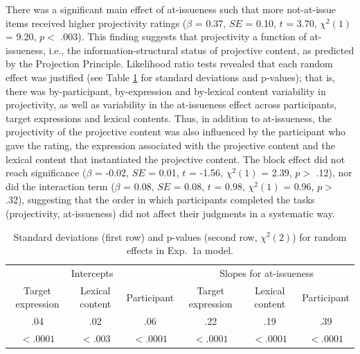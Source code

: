 \documentclass[11pt,fleqn]{article}
\newcommand{\6}{\mbox{$[\hspace*{-.6mm}[$}}
\newcommand{\9}{\mbox{$]\hspace*{-.6mm}]$}}
\newcommand{\tableref}[1]{Table \ref{#1}}
\begin{document}
There was a significant main effect of at-issueness such that more not-at-issue items received higher projectivity ratings ($\beta$ = 0.37, $SE$ = 0.10, $t$ = 3.70, $\chi^2(1)$ = 9.20, $p <$ .003). This finding suggests that projectivity a function of at-issueness, i.e., the information-structural status of projective content, as predicted by the Projection Principle. Likelihood ratio tests revealed that each random effect was justified (see \tableref{tab:random1a} for standard deviations and p-values); that is, there was by-participant, by-expression and by-lexical content variability in projectivity, as well as variability in the at-issueness effect across participants, target expressions and lexical contents. Thus, in addition to at-issueness, the projectivity of the projective content was also influenced by the participant who gave the rating, the expression associated with the projective content and the lexical content that instantiated the projective content. The block effect did not reach significance ($\beta$ = -0.02, $SE$ = 0.01, $t$ = -1.56, $\chi^2(1)$ = 2.39, $p >$ .12), nor did the interaction term ($\beta$ = 0.08, $SE$ = 0.08, $t$ = 0.98, $\chi^2(1)$ = 0.96, $p >$ .32), suggesting that the order in which participants completed the tasks (projectivity, at-issueness) did not affect their judgments in a systematic way. 


\begin{table}
\begin{tabular}{c c c c c c }
\toprule
\multicolumn{3}{c}{Intercepts} & \multicolumn{3}{c}{Slopes for at-issueness}\\
Target expression & Lexical content & Participant & Target expression & Lexical content & Participant\\
\midrule
.04 & .02 & .06 & .22 & .19 & .39\\
$< .0001$ & $< .003$ & $< .0001$ & $< .0001$ & $< .0001$ & $< .0001$ \\
\bottomrule
\end{tabular}
\caption{Standard deviations (first row) and p-values (second row, $\chi^2(2)$) for random effects in Exp.~1a model.}\label{tab:random1a}
\end{table}
\end{document}
